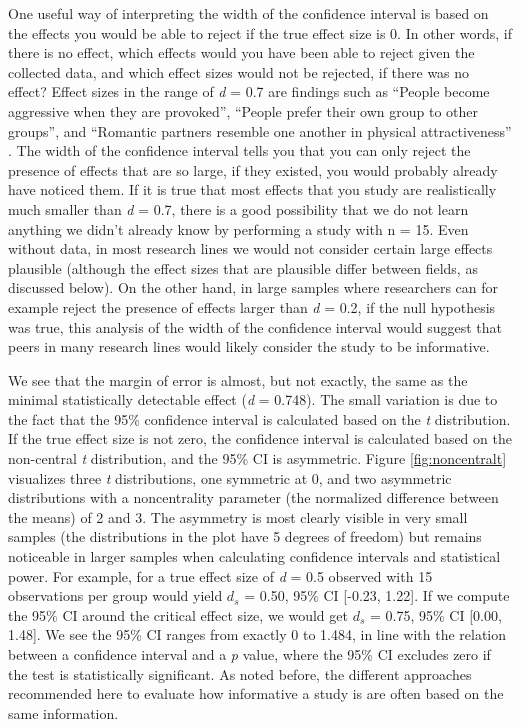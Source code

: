 \documentclass[
  oneside]{krantz}
\begin{document}
One useful way of interpreting the width of the confidence interval is based on the effects you would be able to reject if the true effect size is 0. In other words, if there is no effect, which effects would you have been able to reject given the collected data, and which effect sizes would not be rejected, if there was no effect? Effect sizes in the range of \emph{d} = 0.7 are findings such as ``People become aggressive when they are provoked'', ``People prefer their own group to other groups'', and ``Romantic partners resemble one another in physical attractiveness'' \citep{richard_one_2003}. The width of the confidence interval tells you that you can only reject the presence of effects that are so large, if they existed, you would probably already have noticed them. If it is true that most effects that you study are realistically much smaller than \emph{d} = 0.7, there is a good possibility that we do not learn anything we didn't already know by performing a study with n = 15. Even without data, in most research lines we would not consider certain large effects plausible (although the effect sizes that are plausible differ between fields, as discussed below). On the other hand, in large samples where researchers can for example reject the presence of effects larger than \emph{d} = 0.2, if the null hypothesis was true, this analysis of the width of the confidence interval would suggest that peers in many research lines would likely consider the study to be informative.

We see that the margin of error is almost, but not exactly, the same as the minimal statistically detectable effect (\emph{d} = 0.748). The small variation is due to the fact that the 95\% confidence interval is calculated based on the \emph{t} distribution. If the true effect size is not zero, the confidence interval is calculated based on the non-central \emph{t} distribution, and the 95\% CI is asymmetric. Figure \ref{fig:noncentralt} visualizes three \emph{t} distributions, one symmetric at 0, and two asymmetric distributions with a noncentrality parameter (the normalized difference between the means) of 2 and 3. The asymmetry is most clearly visible in very small samples (the distributions in the plot have 5 degrees of freedom) but remains noticeable in larger samples when calculating confidence intervals and statistical power. For example, for a true effect size of \emph{d} = 0.5 observed with 15 observations per group would yield \(d_s\) = 0.50, 95\% CI {[}-0.23, 1.22{]}. If we compute the 95\% CI around the critical effect size, we would get \(d_s\) = 0.75, 95\% CI {[}0.00, 1.48{]}. We see the 95\% CI ranges from exactly 0 to 1.484, in line with the relation between a confidence interval and a \emph{p} value, where the 95\% CI excludes zero if the test is statistically significant. As noted before, the different approaches recommended here to evaluate how informative a study is are often based on the same information.
\end{document}
